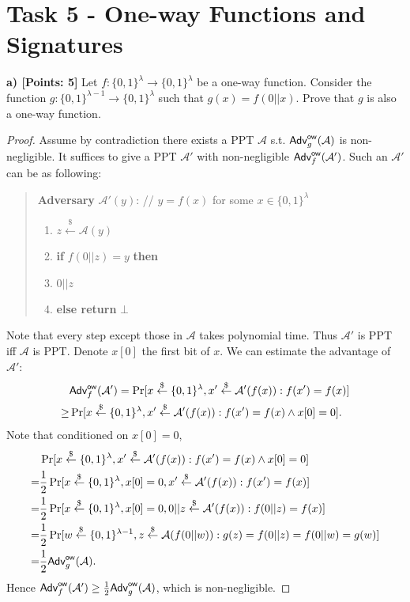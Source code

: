 \documentclass[12pt]{article}
\newcommand{\bits}{\{0,1\}}
\newcommand{\getsr}{\stackrel{\$}{\gets}}
\newcommand{\Adv}{\textsf{Adv}}
\newcommand{\tab}{\hspace{0.3in}}
\theoremstyle{definition}
\newcommand{\A}{\mathcal{A}}
\begin{document}
\section{Task 5 - One-way Functions and Signatures}
{\bf a) [Points: 5]} Let $f : \bits^\lambda \to \bits^\lambda$ be a one-way function. Consider the function $g : \bits^{\lambda-1} \to \bits^\lambda$ such that $g(x) = f(0||x)$. Prove that $g$ is also a one-way function.
\begin{proof}
Assume by contradiction there exists a PPT $\A$ s.t. $\Adv_{g}^{\ow}(\A)$ is non-negligible. It suffices to give a PPT $\A'$ with non-negligible $\Adv_f^{\ow}(\A')$. Such an $\A'$ can be as following:
\begin{quote}
{\bf Adversary} $\A'(y)$: // $y=f(x)$ for some $x \in \bits^\lambda$
\begin{enumerate}
\item $z \getsr \A(y)$
\item {\bf if} $f(0||z) = y$ {\bf then}
\item \tab {\bf return} $0||z$
\item {\bf else return} $\bot$
\end{enumerate}
\end{quote}
Note that every step except those in $\A$ takes polynomial time. Thus $\A'$ is PPT iff $\A$ is PPT.
Denote $x[0]$ the first bit of $x$.
We can estimate the advantage of $\A'$:
$$\begin{aligned}
&\Adv_f^{\ow}(\A') = \Pr[x\getsr\bits^\lambda, x' \getsr \A'(f(x)): f(x')=f(x)] \\
\geq& \Pr[x\getsr\bits^\lambda, x' \getsr \A'(f(x)): f(x')=f(x) \wedge x[0]=0].
\end{aligned}$$
Note that conditioned on $x[0]=0$,
$$\begin{aligned}
&\Pr[x\getsr\bits^\lambda, x' \getsr \A'(f(x)): f(x')=f(x) \wedge x[0]=0] \\
=&\frac{1}{2}\Pr[x\getsr\bits^\lambda, x[0]=0, x' \getsr \A'(f(x)): f(x')=f(x)] \\
=&\frac{1}{2}\Pr[x\getsr\bits^\lambda, x[0]=0, 0||z \getsr \A'(f(x)): f(0||z)=f(x)] \\
=&\frac{1}{2}\Pr[w\getsr\bits^{\lambda-1}, z \getsr \A(f(0||w)): g(z)=f(0||z)=f(0||w)=g(w)] \\
=&\frac{1}{2}\Adv_g^{\ow}(\A).
\end{aligned}$$
Hence $\Adv_f^{\ow}(\A')\geq \frac{1}{2}\Adv_g^{\ow}(\A)$, which is non-negligible.
\end{proof}
\end{document}
